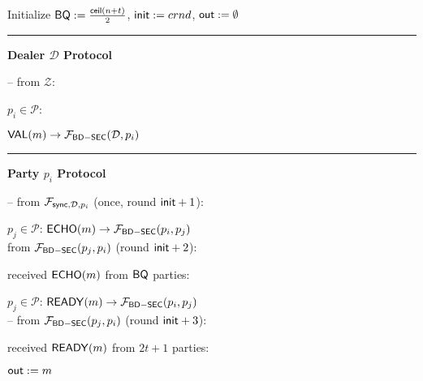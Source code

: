 \begin{bbox}[title={$\Pi_{\msf{Bracha}} (\mathcal{D}, \mathcal{P} = p_1,...,p_n)$ in $\F_{\msf{BD-SEC}}$-hybrid}]

Initialize ${\mathsf {BQ}} := \frac{{\mathsf {ceil}}(n+t)}{2}$, ${\mathsf {init}} := crnd$, ${\mathsf {out}} := \emptyset$

\vspace{2mm} \hrule \vspace{2mm}

{\bf Dealer $\mathcal{D}$ Protocol}

-- \OnInput {} from $\mathcal{Z}$:

	\dquad \For $p_i \in \mathcal{P}$:

		\dquad \quad \Send ${\mathsf {VAL}}(m) \rightarrow \mathcal{F}_{{\mathsf {BD-SEC}}}(\mathcal{D},p_i)$

\vspace{2mm} \hrule \vspace{2mm}

{\bf Party $p_i$ Protocol}

-- \OnInput {} from $\mathcal{F}_{{\mathsf {sync}},\mathcal{D},p_i}$ (once, round ${\mathsf {init}}+1$):

	\dquad \For $p_j \in \mathcal{P}$: \Send ${\mathsf {ECHO}}(m) \rightarrow \mathcal{F}_{{\mathsf {BD-SEC}}}(p_i,p_j)$ \\

 \OnInput {} from $\mathcal{F}_{{\mathsf {BD-SEC}}}(p_j,p_i)$ (round ${\mathsf {init}}+2$):

	\dquad \If received ${\mathsf {ECHO}}(m)$ from ${\mathsf {BQ}}$ parties:

		\dquad \quad \For $p_j \in \mathcal{P}$: \Send ${\mathsf {READY}}(m) \rightarrow \mathcal{F}_{{\mathsf {BD-SEC}}}(p_i,p_j)$ \\

-- \OnInput {} from $\mathcal{F}_{{\mathsf {BD-SEC}}}(p_j,p_i)$ (round ${\mathsf {init}}+3$):

	\dquad \If received ${\mathsf {READY}}(m)$ from $2t+1$ parties:

		\dquad \quad ${\mathsf {out}} := m$





\end{bbox}
